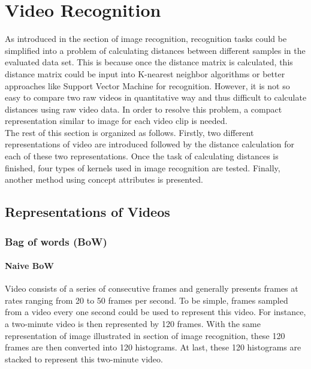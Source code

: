 \section {Video Recognition}
As introduced in the section of image recognition, recognition tasks could be simplified into a problem of calculating distances between different samples in the evaluated data set. This is because once the distance matrix is calculated, this distance matrix could be input into K-nearest neighbor algorithms or better approaches like Support Vector Machine for recognition. However, it is not so easy to compare two raw videos in quantitative way and thus difficult to calculate distances using raw video data. In order to resolve this problem, a compact representation similar to image for each video clip is needed. \\

\noindent The rest of this section is organized as follows. Firstly, two different representations of video are introduced followed by the distance calculation for each of these two representations. Once the task of calculating distances is finished, four types of kernels used in image recognition are tested. Finally, another method using concept attributes is presented. 

\subsection{Representations of Videos}
	\subsubsection{Bag of words (BoW)}
	\paragraph{Naive BoW}
	Video consists of a series of consecutive frames and generally presents frames at rates ranging from 20 to 50 frames per second. To be simple, frames sampled from a video every one second could be used to represent this video. For instance, a two-minute video is then represented by 120 frames. With the same representation of image illustrated in section of image recognition, these 120 frames are then converted into 120 histograms. At last, these 120 histograms are stacked to represent this two-minute video. \\

